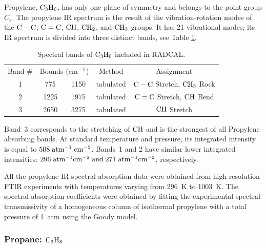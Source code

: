 Propylene, $\rm C_3H_6$, has only one plane of symmetry and belongs to the point group $C_s$. The propylene IR spectrum is the result of the vibration-rotation modes of the $\rm C-C$, $\rm C=C$, $\rm CH$, $\rm CH_2$, and $\rm CH_3$ groups. It has 21 vibrational modes; its IR spectrum is divided into three distinct bands, see Table \ref{Table::C3H6}.
\begin{table}[ht]
   \centering
   \caption{Spectral bands of $\rm C_3H_6$ included in RADCAL.}
   \vspace{0.1in}
   \label{Table::C3H6}
   \begin{tabular}{|c|c|c|c|c|}
    \hline
    Band \# & \multicolumn{2}{|l|}{Bounds (cm$\rm ^{-1}$) } & Method & Assignment \\
    \cline{1-5}
    1 & 775  & 1150 & tabulated &  $\rm C-C$ Stretch, $\rm CH_3$ Rock\\
    2 & 1225 & 1975 & tabulated &  $\rm C=C$ Stretch, $\rm CH$ Bend\\
    3 & 2650 & 3275 & tabulated &  $\rm CH$ Stretch\\
    \hline
   \end{tabular}
\end{table}
Band~3 corresponds to the stretching of $\rm CH$ and is the strongest of all Propylene absorbing bands. At standard temperature and pressure, its integrated intensity is equal to $508\;\rm {atm^{-1}.cm^{-2}}$. Bands~1 and 2 have similar lower integrated intensities: $296\;\rm {atm^{-1}cm^{-2}}\;and\; 271\;\rm {atm^{-1}cm^{-2}}$, respectively.

All the propylene IR spectral absorption data were obtained from high resolution FTIR experiments with temperatures varying from 296~K to 1003~K. The spectral absorption coefficients were obtained by fitting the experimental spectral transmissivity of a homogeneous column of isothermal propylene with a total pressure of 1~atm using the Goody model.

\subsubsection{Propane: $\rm C_3H_8$}

